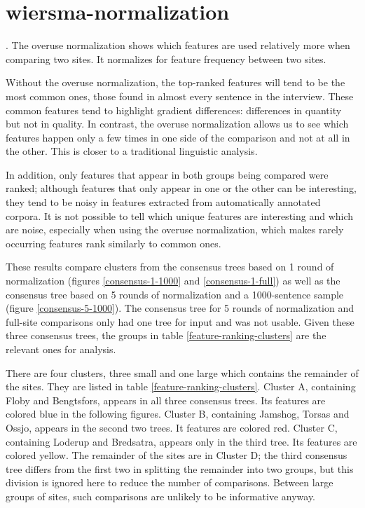 \section{wiersma-normalization}. The overuse normalization shows which
features are used relatively more when comparing two sites. It
normalizes for feature frequency between two sites.

Without the overuse normalization, the top-ranked features will tend to
be the most common ones, those found in almost every sentence in the
interview. These common features tend to highlight gradient
differences: differences in quantity but not in quality. In contrast,
the overuse normalization allows us to see which features happen only
a few times in one side of the comparison and not at all in the
other. This is closer to a traditional linguistic analysis.

In addition, only features that appear in both groups being compared
were ranked; although features that only appear in one or the other
can be interesting, they tend to be noisy in features extracted from
automatically annotated corpora. It is not possible to tell which
unique features are interesting and which are noise, especially when
using the overuse normalization, which makes rarely occurring features
rank similarly to common ones.

These results compare clusters from the consensus trees
based on 1 round of normalization (figures \ref{consensus-1-1000} and
\ref{consensus-1-full}) as well as the consensus tree based on 5
rounds of normalization and a 1000-sentence sample (figure
\ref{consensus-5-1000}). The consensus tree for 5 rounds of
normalization and full-site comparisons only had one tree for input
and was not usable. Given these three consensus trees, the groups in
table \ref{feature-ranking-clusters} are the relevant ones for analysis.

There are four clusters, three small and one large which contains the
remainder of the sites. They are listed in table
\ref{feature-ranking-clusters}. Cluster A, containing Floby and
Bengtsfors, appears in all three consensus trees. Its features are
colored blue in the following figures. Cluster B, containing Jamshog,
Torsas and Ossjo, appears in the second two trees. It features are
colored red. Cluster C, containing Loderup and Bredsatra, appears only
in the third tree. Its features are colored yellow. The remainder of
the sites are in Cluster D; the third consensus tree differs from the
first two in splitting the remainder into two groups, but this
division is ignored here to reduce the number of comparisons. Between
large groups of sites, such comparisons are unlikely to be informative
anyway.

